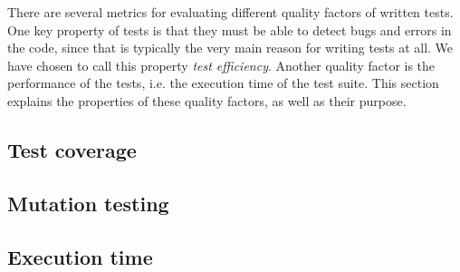 
There are several metrics for evaluating different quality factors of
written tests. One key property of tests is that they must be able to
detect bugs and errors in the code, since that is typically the very
main reason for writing tests at all. We have chosen to call this
property \emph{test efficiency}. Another quality factor is the
performance of the tests, i.e. the execution time of the test suite.
This section explains the properties of these quality factors, as well
as their purpose.\\

\subsection{Test coverage}
\label{sec:coverage}


\subsection{Mutation testing}
\label{sec:theory_mutation}


\subsection{Execution time}

